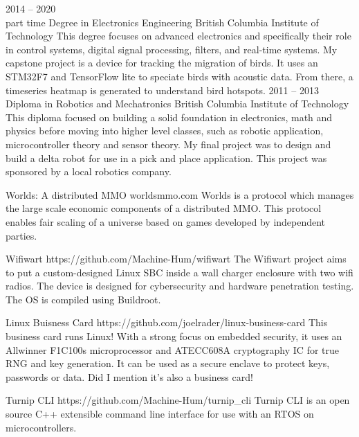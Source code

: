 \documentclass[10pt]{developercv} %
\begin{document}
\begin{entrylist}
	\entry
		{2014 -- 2020\\ \footnotesize{part time}}
		{Degree in Electronics Engineering}
		{British Columbia Institute of Technology}
		{
        This degree focuses on advanced electronics and specifically their role in control systems, digital signal processing, filters, and real-time systems. My capstone project is a device for tracking the migration of birds. It uses an STM32F7 and TensorFlow lite to speciate birds with acoustic data. From there, a timeseries heatmap is generated to understand bird hotspots.
        }
	\entry
		{2011 -- 2013}
		{Diploma in Robotics and Mechatronics}
		{British Columbia Institute of Technology}
		{
        This diploma focused on building a solid foundation in electronics, math and physics before moving into higher level classes, such as robotic application, microcontroller theory and sensor theory. My final project was to design and build a delta robot for use in a pick and place application. This project was sponsored by a local robotics company.
        }
\end{entrylist}



\begin{entrylist}
	\entry
		{}
		{Worlds: A distributed MMO}
		{worldsmmo.com}
		{
        Worlds is a protocol which manages the large scale economic components of a distributed MMO. This protocol enables fair scaling of a universe based on games developed by independent parties.
        }

	\entry
		{}
		{Wifiwart}
		{https://github.com/Machine-Hum/wifiwart}
		{
        The Wifiwart project aims to put a custom-designed Linux SBC inside a wall charger enclosure with two wifi radios. The device is designed for cybersecurity and hardware penetration testing. The OS is compiled using Buildroot.
        }
    
    \entry
		{}
		{Linux Buisness Card}
        {https://github.com/joelrader/linux-business-card}
		{
        This business card runs Linux! With a strong focus on embedded security, it uses an Allwinner F1C100s microprocessor and ATECC608A cryptography IC for true RNG and key generation. It can be used as a secure enclave to protect keys, passwords or data. Did I mention it's also a business card!
        }

    \entry
		{}
		{Turnip CLI}
        {https://github.com/Machine-Hum/turnip\_cli}
		{
        Turnip CLI is an open source C++ extensible command line interface for use with an RTOS on microcontrollers.
        }
\end{entrylist}
\end{document}

